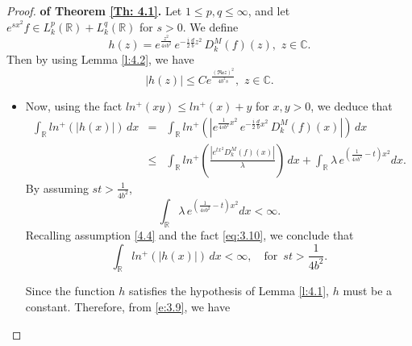 \documentclass[12pt,a4paper,reqno]{amsproc}
\theoremstyle{definition}
\theoremstyle{remark}
\numberwithin{equation}{section}
\begin{document}
\begin{proof} {\bf of Theorem \ref{Th: 4.1}.}
Let $1\le p,q\le \infty$, and let $e^{sx^2}f\in L^p_k(\mathbb{R})+L^{q}_k(\mathbb{R})$ for $s>0$. We define 
\begin{equation}\label{e:3.9}
h(z) = e^{\frac{z^2}{4sb^2}}\, e^{-\frac{i}{2}\frac{d}{b}z^2}\,D_k^M(f)(z), \,\, z\in \mathbb{C}.
\end{equation}
Then by using Lemma \ref{l:4.2}, we have
 $$|h(z)| \le Ce^{\frac{(\mathfrak{Re}z)^2}{4b^2s}},\,\, z\in \mathbb{C}.$$
\begin{itemize}
        \item [$(i)$.] Now, using the fact  $ln^+(xy)\le ln^+(x)+y$ for $x,y>0$, we deduce that 
 \begin{eqnarray*}
     \int_{\mathbb{R}}ln^+(|h(x)|)\, dx&=& \int_{\mathbb{R}}ln^+\left(|e^{\frac{1}{4sb^2}x^2}\, e^{-\frac{i}{2}\frac{d}{b}x^2}\,D_k^M(f)(x)|\right)\, dx\\
     &\le& \int_{\mathbb{R}} ln^+\left(\frac{|e^{tx^2}D_k^M(f)(x)|}{\lambda}\right)\, dx+\int_{\mathbb{R}} \lambda \,e^{\left(\frac{1}{4sb^2}-t \right)x^2} dx.
 \end{eqnarray*}
 By assuming $st>\frac{1}{4b^2}$,
\begin{equation}\label{eq:3.10}
\int_{\mathbb{R}} \lambda \,e^{\left(\frac{1}{4sb^2}-t \right)x^2} dx < \infty.    
\end{equation}
Recalling assumption  \eqref{4.4} and the fact \eqref{eq:3.10}, we conclude that
\begin{equation*}
 \int_{\mathbb{R}} ln^+(|h(x)|)\, dx < \infty, \quad \text{for}\,\,\,  st>\frac{1}{4b^2}. \end{equation*}

Since the function $h$ satisfies the hypothesis of  Lemma \ref{l:4.1}, $h$ must be a constant. Therefore, from \eqref{e:3.9}, we have



\end{itemize}
\end{proof}
\end{document}
